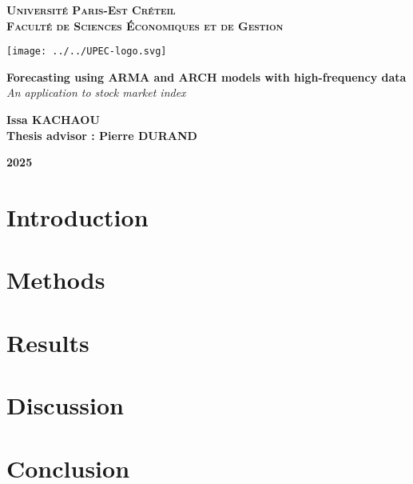 \documentclass[a4paper, 12pt]{article}
\begin{document}
	\begin{titlepage}
		\centering
\textsc{{\LARGE \textbf{Université Paris-Est Créteil}}} \\
\vspace*{0.5cm}
\textsc{{\LARGE \textbf{Faculté de Sciences Économiques et de Gestion}}}
\vspace*{2cm}

		\begin{center}
\texttt{[image: ../../UPEC-logo.svg]}
		\end{center}
		\vspace*{2cm}
		
		\LARGE
		
		\textbf{Forecasting using ARMA and ARCH models with high-frequency data}\\
			\textit{An application to stock market index}\\
		\vspace{1cm}		
		\Large

		\vspace{1cm}
		
		\textbf{Issa KACHAOU}\\
		\large
		\textbf{Thesis advisor : Pierre DURAND} \\
		
		
		
		\vfill
		
		\Large

		\textbf{2025}
		
	\end{titlepage}
\pagestyle{plain}
\part*{Introduction}


\part*{Methods}


\part*{Results}


\part*{Discussion}



\part*{Conclusion}
\end{document}
